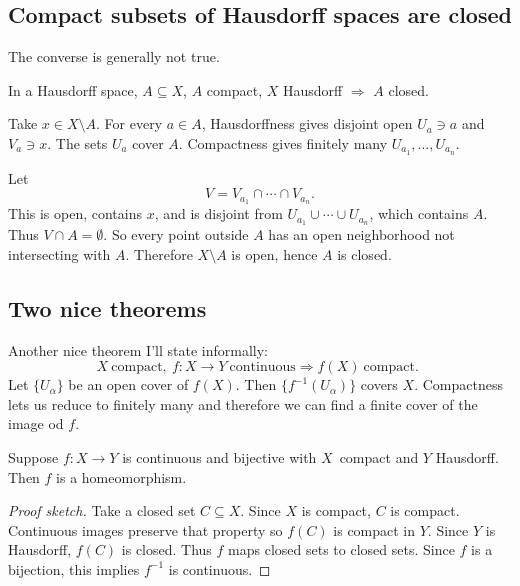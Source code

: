 \documentclass[11pt]{article}
\begin{document}
\subsection{Compact subsets of Hausdorff spaces are closed} 
The converse is generally not true. 

In a Hausdorff space, $A \subseteq X$, $A$ compact, $X$ 
Hausdorff $\Rightarrow$ $A$ closed. 

Take $x \in X \setminus A$. For every $a \in A$, 
Hausdorffness gives disjoint open 
$U_a \ni a$ and $V_a \ni x$. 
The sets $U_a$ cover $A$. 
Compactness gives finitely many $U_{a_1}, \ldots, U_{a_n}$. 

Let 
\[
    V = V_{a_1} \cap \cdots \cap V_{a_n}. 
\]
This is open, contains $x$, and is disjoint 
from $U_{a_1} \cup \cdots \cup U_{a_n}$, which 
contains $A$. Thus $V \cap A = \emptyset$. So 
every point outside $A$ has an open neighborhood 
not intersecting with $A$. 
Therefore $X \setminus A$ is open, hence $A$ is closed. 

\subsection{Two nice theorems}
Another nice theorem I'll state informally: 
\[
    X \ \text{compact}, \ f: X \to Y \ \text{continuous} 
    \Rightarrow f(X) \ \text{compact. }
\]
Let $\{U_\alpha\}$ be an open cover of $f(X)$. 
Then $\{f^{-1}(U_\alpha)\}$ covers $X$. 
Compactness lets us reduce to finitely many and therefore 
we can find a finite cover of the image od $f$. 

\begin{thm}
    Suppose $f: X \to Y$ is continuous 
    and bijective with $X$ compact and $Y$ Hausdorff. 
    Then $f$ is a homeomorphism. 
\end{thm}
\begin{proof}[Proof sketch]
    Take a closed set $C \subseteq X$. Since 
    $X$ is compact, $C$ is compact. Continuous images 
    preserve that property so $f(C)$ is compact in $Y$. 
    Since $Y$ is Hausdorff, $f(C)$ is closed. Thus 
    $f$ maps closed sets to closed sets. 
    Since $f$ is a bijection, this implies $f^{-1}$ is continuous.
\end{proof}
\end{document}

